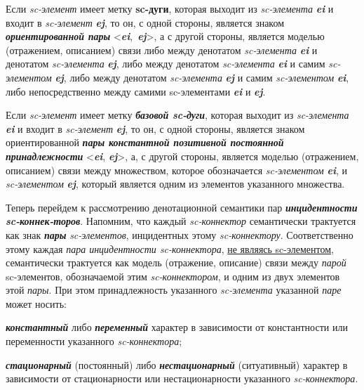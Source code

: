 \begin{SCn}
{Если \textit{sc-элемент} имеет метку \textbf{\textbf{sc-дуги}}, которая выходит из \textit{sc-элемента} \textit{\textbf{ei}} и входит в \textit{sc-элемент} \textit{\textbf{ej}}, то он, с одной стороны, является знаком \textit{\textbf{ориентированной пары}} \mbox{<\textit{\textbf{ei}}, \textit{\textbf{ej}}>}, а с другой стороны, является моделью (отражением, описанием) связи либо между денотатом \textit{sc-элемента} \textit{\textbf{ei}} и денотатом \textit{sc-элемента} \textit{\textbf{ej}}, либо между денотатом \textit{sc-элемента} \textit{\textbf{ei}} и самим \textit{sc-элементом} \textit{\textbf{ej}}, либо между денотатом \textit{sc-элемента} \textit{\textbf{ej}} и самим \textit{sc-элементом} \textit{\textbf{ei}}, либо непосредственно между самими sc-элементами \textit{\textbf{ei}} и \textit{\textbf{ej}}.

Если \textit{sc-элемент} имеет метку \textit{\textbf{базовой sc-дуги}}, которая выходит из \textit{sc-элемента} \textit{\textbf{ei}} и входит в \textit{sc-элемент} \textit{\textbf{ej}}, то он, с одной стороны, является знаком ориентированной \textit{\textbf{пары константной позитивной постоянной принадлежности}} <\textit{\textbf{ei}}, \textit{\textbf{ej}}>, а, с другой стороны, является моделью (отражением, описанием) связи между множеством, которое обозначается \textit{sc-элементом} \textit{\textbf{ei}}, и \textit{sc-элементом} \textit{\textbf{ej}}, который является одним из элементов указанного множества.

Теперь перейдем к рассмотрению денотационной семантики пар \textit{\textbf{инцидентности}} \textit{\textbf{sc-коннек-торов}}. Напомним, что каждый \textit{sc-коннектор} семантически трактуется как знак \textit{\textbf{пары}} \textit{sc-элементов}, инцидентных этому \textit{sc-коннектору}. Соответственно этому каждая \textit{пара инцидентности sc-коннектора}, \uline{не являясь sc-элементом}, семантически трактуется как модель (отражение, описание) связи между \textit{парой} sc-элементов, обозначаемой этим \textit{sc-коннектором}, и одним из двух элементов этой \textit{пары}. При этом принадлежность указанного \textit{sc-элемента} указанной \textit{паре} может носить:

\begin{scnitemize}
    \item \textit{\textbf{константный}} либо \textit{\textbf{переменный}} характер в зависимости от константности или переменности указанного \textit{sc-коннектора};
    \item \textit{\textbf{стационарный}} (постоянный) либо \textit{\textbf{нестационарный}} (ситуативный) характер в зависимости от стационарности или нестационарности указанного \textit{sc-коннектора}.
\end{scnitemize}

}
\end{SCn}
